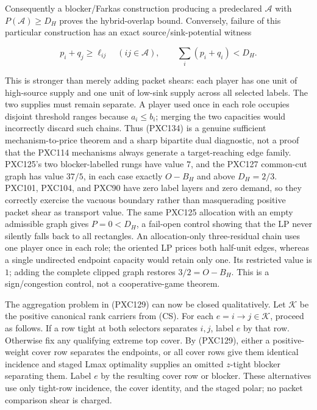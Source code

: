 \documentclass[11pt]{article}
\begin{document}
Consequently a blocker/Farkas construction producing a predeclared
\(\mathcal A\) with \(P(\mathcal A)\ge D_H\) proves the hybrid-overlap
bound.  Conversely, failure of this particular construction has an exact
source/sink-potential witness

\begin{equation}
 p_i+q_j\ge\ell_{ij}\quad(ij\in\mathcal A),\qquad
             \sum_i(p_i+q_i)<D_H.                         \tag{PXC134d}
\end{equation}

This is stronger than merely adding packet shears: each player has one unit
of high-source supply and one unit of low-sink supply across all selected
labels.  The two supplies must remain separate.  A player used once in each
role occupies disjoint threshold ranges because \(a_i\le b_i\); merging the
two capacities would incorrectly discard such chains.  Thus (PXC134) is a
genuine sufficient mechanism-to-price theorem and a sharp bipartite dual diagnostic,
not a proof that the PXC114 mechanisms always generate a target-reaching
edge family.  PXC125's two blocker-labelled rungs have value \(7\), and the
PXC127 common-cut graph has value \(37/5\), in each case exactly \(O-B_H\)
and above \(D_H=2/3\).  PXC101, PXC104, and PXC90 have zero label layers and
zero demand, so they correctly exercise the vacuous boundary rather than
masquerading positive packet shear as transport value.  The same PXC125
allocation with an empty admissible graph gives \(P=0<D_H\), a fail-open
control showing that the LP never silently falls back to all rectangles.
An allocation-only three-residual chain uses one player once in each role;
the oriented LP prices both half-unit edges, whereas a single undirected
endpoint capacity would retain only one.  Its restricted value is \(1\);
adding the complete clipped graph restores \(3/2=O-B_H\).  This is a
sign/congestion control, not a cooperative-game theorem.

The aggregation problem in (PXC129) can now be closed qualitatively.  Let
\(\mathcal K\) be the positive canonical rank carriers from (CS).  For each
\(e=i\to j\in\mathcal K\), proceed as follows.  If a row tight at both
selectors separates \(i,j\), label \(e\) by that row.  Otherwise fix any
qualifying extreme top cover.  By (PXC129), either a positive-weight cover
row separates the endpoints, or all cover rows give them identical incidence
and staged Lmax optimality supplies an omitted \(z\)-tight blocker separating
them.  Label \(e\) by the resulting cover row or blocker.  These alternatives
use only tight-row incidence, the cover identity, and the staged polar; no
packet comparison shear is charged.
\end{document}
